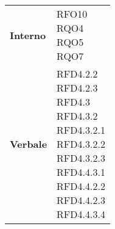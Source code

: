 \begin{longtable}[H]{| >{\centering\bfseries}p{8cm} | >{\centering\arraybackslash}p{8cm} |}
    \rowcolor{white}
    Interno                          &
    \makecell{
        \rule{0pt}{4ex}
    RFO10                                                                                                        \\
    RQO4                                                                                                         \\
    RQO5                                                                                                         \\
    RQO7                                                                                                         \\
        \rule{0pt}{2ex}
    }                                                                                                            \\

    \rowcolor{white!80!lightgray!90}
    Verbale                          &
    \makecell{
        \rule{0pt}{4ex}
    RFD4.2.2                                                                                                     \\
    RFD4.2.3                                                                                                     \\
    RFD4.3                                                                                                       \\
    RFD4.3.2                                                                                                     \\
    RFD4.3.2.1                                                                                                   \\
    RFD4.3.2.2                                                                                                   \\
    RFD4.3.2.3                                                                                                   \\
    RFD4.4.3.1                                                                                                   \\
    RFD4.4.2.2                                                                                                   \\
    RFD4.4.2.3                                                                                                   \\
    RFD4.4.3.4                                                                                                   \\
        \rule{0pt}{2ex}
    }                                                                                                            \\


\end{longtable}
